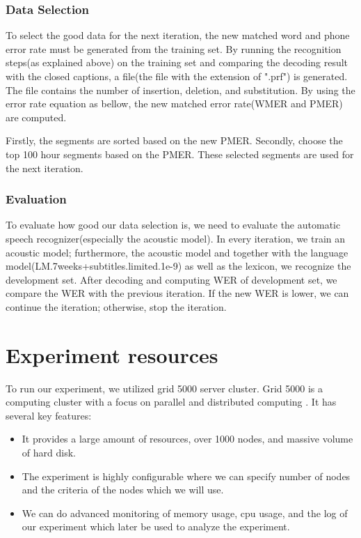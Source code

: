 \subsubsection{Data Selection}
To select the good data for the next iteration, the new matched word and phone error rate must be generated from the training set. By running the recognition steps(as explained above) on the training set and comparing the decoding result with the closed captions, a file(the file with the extension of ".prf") is generated. The file contains the number of insertion, deletion, and substitution. By using the error rate equation as bellow, the new matched error rate(WMER and PMER) are computed. 

Firstly, the segments are sorted based on the new PMER. Secondly, choose the top 100 hour segments based on the PMER. These selected segments are used for the next iteration. 

\subsubsection{Evaluation}
To evaluate how good our data selection is, we need to evaluate the automatic speech recognizer(especially the acoustic model). In every iteration, we train an acoustic model; furthermore, the acoustic model and together with the language model(LM.7weeks+subtitles.limited.1e-9) as well as the lexicon, we recognize the development set. After decoding and computing WER of development set, we compare the WER with the previous iteration. If the new WER is lower, we can continue the iteration; otherwise, stop the iteration. 
 

\section{Experiment resources}
To run our experiment, we utilized grid 5000 server cluster. Grid 5000 is a computing cluster with a focus on parallel and distributed computing \cite{Grid5000}. It has several key features:
\begin{itemize}
\item It provides a large amount of resources, over 1000 nodes, and massive volume of hard disk.
\item The experiment is highly configurable where we can specify number of nodes and the criteria of the nodes which we will use.
\item We can do advanced monitoring of memory usage, cpu usage, and the log of our experiment which later be used to analyze the experiment.
\end{itemize}

